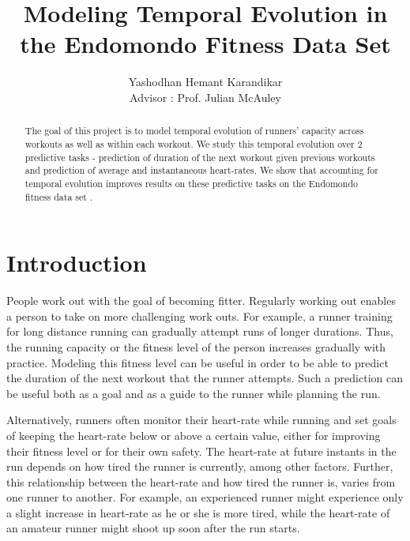 \documentclass{acm_proc_article-sp}
\begin{document}
\title{Modeling Temporal Evolution in the Endomondo Fitness Data Set}
%
%
\author{
\alignauthor
Yashodhan Hemant Karandikar\\
\bigskip
       {Advisor : Prof. Julian McAuley}
}


\maketitle
\begin{abstract}
The goal of this project is to model temporal evolution of runners' capacity across workouts as well as within each workout. We study this temporal evolution over 2 predictive tasks - prediction of duration of the next workout given previous workouts and prediction of average and instantaneous heart-rates. We show that accounting for temporal evolution improves results on these predictive tasks on the Endomondo fitness data set \cite{endomondo}.
\end{abstract}

\section{Introduction}
People work out with the goal of becoming fitter. Regularly working out enables a person to take on more challenging work outs. For example, a runner training for long distance running can gradually attempt runs of longer durations. Thus, the running capacity or the fitness level of the person increases gradually with practice. Modeling this fitness level can be useful in order to be able to predict the duration of the next workout that the runner attempts. Such a prediction can be useful both as a goal and as a guide to the runner while planning the run.

Alternatively, runners often monitor their heart-rate while running and set goals of keeping the heart-rate below or above a certain value, either for improving their fitness level or for their own safety. The heart-rate at future instants in the run depends on how tired the runner is currently, among other factors. Further, this relationship between the heart-rate and how tired the runner is, varies from one runner to another. For example, an experienced runner might experience only a slight increase in heart-rate as he or she is more tired, while the heart-rate of an amateur runner might shoot up soon after the run starts.
\end{document}
